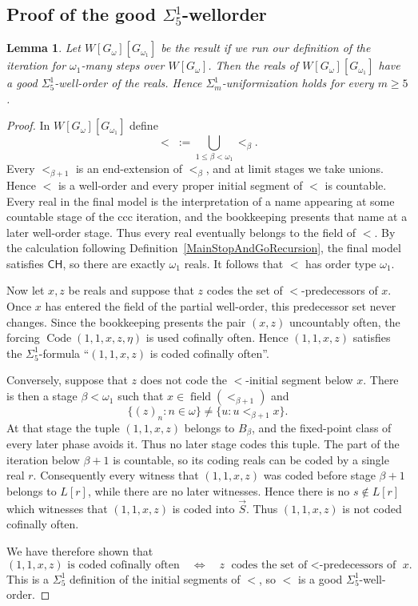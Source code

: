 \documentclass[a4paper,11pt]{article}
\newtheorem{lemma}[theorem]{Lemma}
\newcommand{\CH}{\mathsf{CH}}
\begin{document}
\subsection{Proof of the good \texorpdfstring{$\Sigma^1_5$}{Sigma15}-wellorder}

\begin{lemma}
Let $W[G_\omega][G_{\omega_1}]$ be the result if we run our definition of the iteration for $\omega_1$-many steps over $W[G_\omega]$.
Then the reals of $W[G_\omega][G_{\omega_1}]$ have a good $\Sigma^1_5$-well-order of the reals. Hence $\Sigma^1_m$-uniformization holds for every $m\geq5$.
\end{lemma}
\begin{proof}
In $W[G_\omega][G_{\omega_1}]$ define
\[
<\;:=\bigcup_{1\leq\beta<\omega_1}<_\beta.
\]
Every $<_{\beta+1}$ is an end-extension of $<_\beta$, and at limit stages we take unions. Hence $<$ is a well-order and every proper initial segment of $<$ is countable. Every real in the final model is the interpretation of a name appearing at some countable stage of the ccc iteration, and the bookkeeping presents that name at a later well-order stage. Thus every real eventually belongs to the field of $<$. By the calculation following Definition~\ref{MainStopAndGoRecursion}, the final model satisfies $\CH$, so there are exactly $\omega_1$ reals. It follows that $<$ has order type $\omega_1$.

Now let $x,z$ be reals and suppose that $z$ codes the set of $<$-predecessors of $x$. Once $x$ has entered the field of the partial well-order, this predecessor set never changes. Since the bookkeeping presents the pair $(x,z)$ uncountably often, the forcing $\operatorname{Code}(1,1,x,z,\eta)$ is used cofinally often. Hence $(1,1,x,z)$ satisfies the $\Sigma^1_5$-formula ``$(1,1,x,z)$ is coded cofinally often''.

Conversely, suppose that $z$ does not code the $<$-initial segment below $x$. There is then a stage $\beta<\omega_1$ such that $x\in\operatorname{field}(<_{\beta+1})$ and
\[
\{(z)_n:n\in\omega\}\neq\{u:u<_{\beta+1}x\}.
\]
At that stage the tuple $(1,1,x,z)$ belongs to $B_\beta$, and the fixed-point class of every later phase avoids it. Thus no later stage codes this tuple. The part of the iteration below $\beta+1$ is countable, so its coding reals can be coded by a single real $r$. Consequently every witness that $(1,1,x,z)$ was coded before stage $\beta+1$ belongs to $L[r]$, while there are no later witnesses. Hence there is no $s\notin L[r]$ which witnesses that $(1,1,x,z)$ is coded into $\vec S$. Thus $(1,1,x,z)$ is not coded cofinally often.

We have therefore shown that
\[
(1,1,x,z)\text{ is coded cofinally often}
\quad\Longleftrightarrow\quad
z\text{ codes the set of $<$-predecessors of }x.
\]
This is a $\Sigma^1_5$ definition of the initial segments of $<$, so $<$ is a good $\Sigma^1_5$-well-order.
\end{proof}
\end{document}
